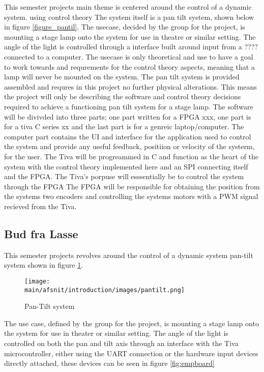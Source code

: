 \documentclass[../../main]{subfiles}
\begin{document}
This semester projects main theme is centered around the control of a dynamic system. using control theory The system itself is a pan tilt system, shown below in figure \ref{figure_pantil}. The usecase, decided by the group for the project, is mounting a stage lamp onto the system for use in theatre or similar setting. The angle of the light is controlled through a interface built around input from a ???? connected to a computer. The usecase is only theoretical and use to have a goal to work towards and requrements for the control theory aspects, meaning that a lamp will never be mounted on the system. The pan tilt system is provided assembled and requres in this project no further physical alterations. This means the project will only be describing the software and control theory decisions required to achieve a functioning pan tilt system for a stage lamp. The software will be divivded into three parts; one part written for a  FPGA xxx, one part is for a tiva C series xx and the last part is for a genreic laptop/computer. The computer part contains the UI and interface for the application used to control the system and provide any useful feedback, positiion or velocity of the systerm, for the user. The Tiva will be progreammed in C and function as the heart of the system with the control theory implemented here and an SPI connecting  itself and the FPGA. The Tiva's porpuse will esssentially be to control the system through the FPGA The FPGA will be responsible for obtaining the position from the systems two encoders and controlling the systems motors with a PWM signal recieved from the Tiva. 

\subsection*{Bud fra Lasse}

This semester projects revolves around the control of a dynamic system pan-tilt  system shown in figure \ref{fig:system}.

\begin{figure}[H]
\centering
\texttt{[image: \\main/afsnit/introduction/images/pantilt.png]}
\caption{Pan-Tilt system}
\label{fig:system}
\end{figure}

The use case, defined by the group for the project, is mounting a stage lamp onto the system for use in theater or similar setting.
The angle of the light is controlled on both the pan and tilt axis through an interface with the Tiva microcontroller, either using the UART connection or the hardware input devices directly attached, these devices can be seen in figure \ref{fig:empboard}  
\end{document}
